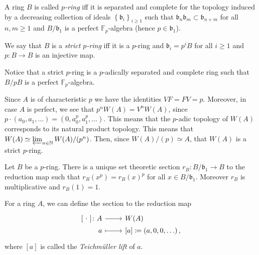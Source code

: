 \begin{defn}
	A ring $B$ is called {\em $p$-ring} iff it is separated and complete
	for the topology induced by a decreasing collection of ideals
	$\left\{ \mathfrak{b}_i \right\}_{i \geq 1}$ such that 
	$\mathfrak{b}_n \mathfrak{b}_m \subset \mathfrak{b}_{n+m}$
	for all $n,m \geq 1$
	and $B/\mathfrak{b}_1$ is a perfect $\mathbb{F}_p$-algebra
	(hence $p \in \mathfrak{b}_1$).

	We say that $B$ is a {\em strict $p$-ring} iff it is a $p$-ring
	and $\mathfrak{b}_i = p^iB$ for all $i \geq 1$
	and $p\colon B \to B$ is an injective map.
\end{defn}


\begin{rem}[]
	Notice that a strict $p$-ring is a $p$-adically separated and complete
	ring such that $B/pB$ is a perfect $\mathbb{F}_p$-algebra.
\end{rem}


\begin{rem}[]
	Since $A$ is of characteristic $p$ we have the identities
	$VF = FV = p$.
	Moreover, in case $A$ is perfect, we see that $p^nW(A) = V^nW(A)$,
	since $p \cdot \left( a_0, a_1, \ldots \right) =
	(0, a_0^p, a_1^p, \ldots)$.
	This means that the $p$-adic topology of $W(A)$ corresponds
	to its natural product topology.
	This means that $W(A) \simeq \varprojlim_{n \in \mathbb{N}} W(A)/ (p^n)$.
	Then, since $W(A)/ (p) \simeq A$, that $W(A)$ is a strict $p$-ring.
\end{rem}


\begin{lem}\label{pRingSection}
	Let $B$ be a $p$-ring.
	There is a unique set theoretic section
	$r_B\colon B/\mathfrak{b}_1 \to B$
	to the reduction map such that
	$r_B(x^p) = r_B(x)^p$
	for all $x \in B/\mathfrak{b}_1$.
	Moreover $r_B$ is multiplicative and $r_B(1) = 1$.
\end{lem} 


\begin{defn}
	For a ring $A$, we can define the section to the reduction map
	\begin{equation*}
	\begin{tikzcd}[row sep = 0ex
		,/tikz/column 1/.append style={anchor=base east}
		,/tikz/column 2/.append style={anchor=base west}]
		[\ \cdot \ ]\colon A \arrow[r, "", rightarrow] &
		W(A) \\
		a \arrow[r, "", mapsto] &
		[a] [a] \coloneqq \left( a, 0, 0, \ldots \right)
	,\end{tikzcd}
	\end{equation*} 
	where $[a]$ is called the {\em Teichmüller lift} of $a$.
\end{defn}


